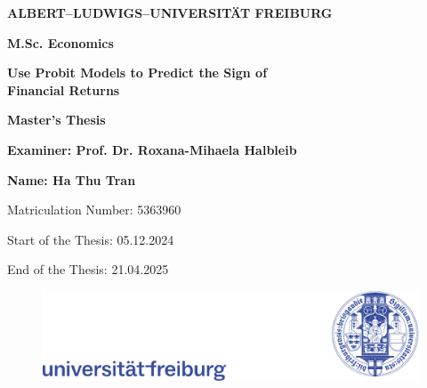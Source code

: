 

\begin{titlepage}
\begin{center}
\vspace{1cm}

\textbf{\Large ALBERT–LUDWIGS–UNIVERSITÄT FREIBURG}

\vspace{0.5cm}
\textbf{\Large M.Sc. Economics}

\vspace{2cm}
\textbf{\Large Use Probit Models to Predict the Sign of \\Financial Returns}

\vspace{1.5cm}
\textbf{Master's Thesis}

\vspace{0.5cm}
\textbf{Examiner: Prof. Dr. Roxana-Mihaela Halbleib}

\vspace{0.5cm}
\textbf{Name: Ha Thu Tran}

\vspace{0.5cm}
Matriculation Number: 5363960

\vspace{0.5cm}
Start of the Thesis: 05.12.2024

\vspace{0.5cm}
End of the Thesis: 21.04.2025

\vspace{2cm}
\end{center}
 \vfill 
    \begin{figure}[b]
        \centering
        \includegraphics[width=\linewidth]{figures/title page/logo.pdf}
    \end{figure}
\end{titlepage}


\restoregeometry